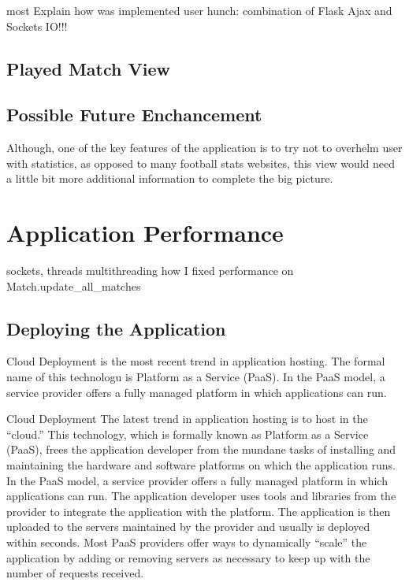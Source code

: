  most Explain how was implemented user hunch: combination of Flask Ajax and Sockets IO!!!
 
\subsection{Played Match View}
\label{subsec:playedmatchview}

\subsection{Possible Future Enchancement}
\label{subsec:enchancement}

Although, one of the key features of the application is to try not to overhelm user with statistics, as opposed to many football stats websites, this view would need a little bit more additional information to complete the big picture.

\section{Application Performance}
sockets, threads
multithreading
how I fixed performance on Match.update\_all\_matches

\subsection{Deploying the Application}
Cloud Deployment is the most recent trend in application hosting. The formal name of this technologu is Platform as a Service (PaaS).  In the PaaS model, a service provider offers a fully managed platform in which applications can run.


Cloud Deployment The latest trend in application hosting is to host in the “cloud.” This technology, which is formally known as Platform as a Service (PaaS), frees the application developer from the mundane tasks of installing and maintaining the hardware and software platforms on which the application runs. In the PaaS model, a service provider offers a fully managed platform in which applications can run. The application developer uses tools and libraries from the provider to integrate the application with the platform. The application is then uploaded to the servers maintained by the provider and usually is deployed within seconds. Most PaaS providers offer ways to dynamically “scale” the application by adding or removing servers as necessary to keep up with the number of requests received.

